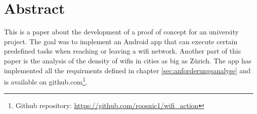 \thispagestyle{empty}
\chapter*{Abstract}
\label{sec:abstract}
This is a paper about the development of a proof of concept for an university project. The goal was to implement an Android app that can execute certain predefined tasks when reaching or leaving a wifi network. Another part of this paper is the analysis of the density of wifis in cities as big as Zürich. The app has implemented all the requirments defined in chapter \ref{sec:anforderungsanalyse} and is available on github.com\footnote{Github repository: \url{https://github.com/roosnic1/wifi_action}}.